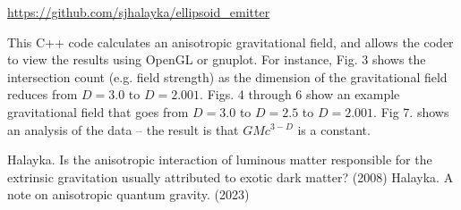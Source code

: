 \documentclass[12pt]{article}
\begin{document}
\url{https://github.com/sjhalayka/ellipsoid_emitter}

This C++ code calculates an anisotropic gravitational field, and allows the coder to view the results using OpenGL or gnuplot.
For instance, Fig. 3 shows the intersection count (e.g. field strength) as the dimension of the gravitational field reduces from $D = 3.0$ to $D = 2.001$. 
Figs. 4 through 6 show an example gravitational field that goes from $D = 3.0$ to $D = 2.5$ to $D = 2.001$.
Fig 7. shows an analysis of the data -- the result is that $GM c^{3 - D}$ is a constant.

\begin{thebibliography}{9}

 Halayka. Is the anisotropic interaction of luminous matter responsible for the extrinsic gravitation usually attributed to exotic dark matter? (2008)
 Halayka. A note on anisotropic quantum gravity. (2023)
\end{thebibliography}





\pagebreak
\end{document}
